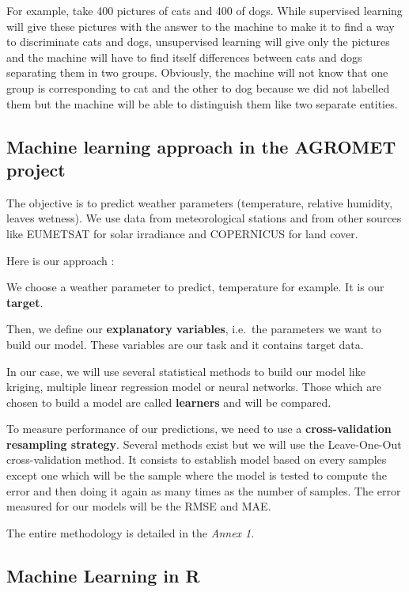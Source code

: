 \documentclass[12pt,twoside]{reedthesis}
\theoremstyle{definition}
\theoremstyle{definition}
\theoremstyle{definition}
\theoremstyle{remark}
\begin{document}
For example, take 400 pictures of cats and 400 of dogs. While supervised
learning will give these pictures with the answer to the machine to make
it to find a way to discriminate cats and dogs, unsupervised learning
will give only the pictures and the machine will have to find itself
differences between cats and dogs separating them in two groups.
Obviously, the machine will not know that one group is corresponding to
cat and the other to dog because we did not labelled them but the
machine will be able to distinguish them like two separate entities.

\subsection{Machine learning approach in the AGROMET
project}\label{machine-learning-approach-in-the-agromet-project}

The objective is to predict weather parameters (temperature, relative
humidity, leaves wetness). We use data from meteorological stations and
from other sources like EUMETSAT for solar irradiance and COPERNICUS for
land cover.

Here is our approach :

We choose a weather parameter to predict, temperature for example. It is
our \textbf{target}.

Then, we define our \textbf{explanatory variables}, i.e.~the parameters
we want to build our model. These variables are our task and it contains
target data.

In our case, we will use several statistical methods to build our model
like kriging, multiple linear regression model or neural networks. Those
which are chosen to build a model are called \textbf{learners} and will
be compared.

To measure performance of our predictions, we need to use a
\textbf{cross-validation resampling strategy}. Several methods exist but
we will use the Leave-One-Out cross-validation method. It consists to
establish model based on every samples except one which will be the
sample where the model is tested to compute the error and then doing it
again as many times as the number of samples. The error measured for our
models will be the RMSE and MAE.

The entire methodology is detailed in the \emph{Annex 1}.

\subsection{Machine Learning in R}\label{machine-learning-in-r}
\end{document}

